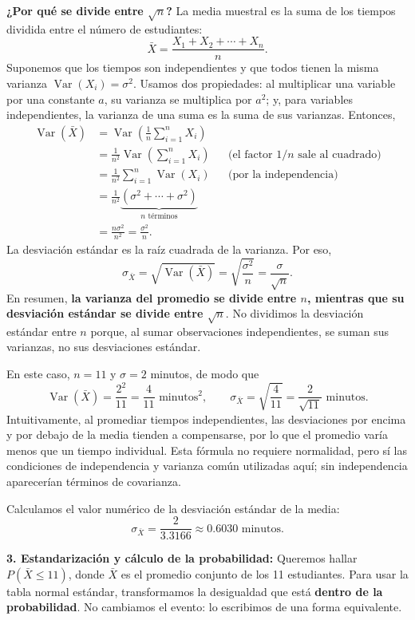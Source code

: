 \documentclass[a4paper]{article}
\begin{document}
\textbf{¿Por qué se divide entre $\sqrt{n}$?}
La media muestral es la suma de los tiempos dividida entre el número de estudiantes:
\[
\bar{X}=\frac{X_1+X_2+\cdots+X_n}{n}.
\]
Suponemos que los tiempos son independientes y que todos tienen la misma varianza $\operatorname{Var}(X_i)=\sigma^2$. Usamos dos propiedades: al multiplicar una variable por una constante $a$, su varianza se multiplica por $a^2$; y, para variables independientes, la varianza de una suma es la suma de sus varianzas. Entonces,
\begin{align*}
\operatorname{Var}(\bar{X})
&=\operatorname{Var}\left(\frac{1}{n}\sum_{i=1}^{n}X_i\right)\\
&=\frac{1}{n^2}\operatorname{Var}\left(\sum_{i=1}^{n}X_i\right)
&&\text{(el factor $1/n$ sale al cuadrado)}\\
&=\frac{1}{n^2}\sum_{i=1}^{n}\operatorname{Var}(X_i)
&&\text{(por la independencia)}\\
&=\frac{1}{n^2}\underbrace{(\sigma^2+\cdots+\sigma^2)}_{n\text{ términos}}\\
&=\frac{n\sigma^2}{n^2}=\frac{\sigma^2}{n}.
\end{align*}
La desviación estándar es la raíz cuadrada de la varianza. Por eso,
\[
\sigma_{\bar{X}}=\sqrt{\operatorname{Var}(\bar{X})}
=\sqrt{\frac{\sigma^2}{n}}
=\frac{\sigma}{\sqrt{n}}.
\]
En resumen, \textbf{la varianza del promedio se divide entre $n$, mientras que su desviación estándar se divide entre $\sqrt{n}$}. No dividimos la desviación estándar entre $n$ porque, al sumar observaciones independientes, se suman sus varianzas, no sus desviaciones estándar.

En este caso, $n=11$ y $\sigma=2$ minutos, de modo que
\[
\operatorname{Var}(\bar{X})=\frac{2^2}{11}=\frac{4}{11}\text{ minutos}^2,
\qquad
\sigma_{\bar{X}}=\sqrt{\frac{4}{11}}=\frac{2}{\sqrt{11}}\text{ minutos}.
\]
Intuitivamente, al promediar tiempos independientes, las desviaciones por encima y por debajo de la media tienden a compensarse, por lo que el promedio varía menos que un tiempo individual. Esta fórmula no requiere normalidad, pero sí las condiciones de independencia y varianza común utilizadas aquí; sin independencia aparecerían términos de covarianza.

Calculamos el valor numérico de la desviación estándar de la media:
$$\sigma_{\bar{X}} = \frac{2}{3.3166} \approx 0.6030 \text{ minutos.}$$

\textbf{3. Estandarización y cálculo de la probabilidad:}
Queremos hallar $P(\bar{X} \le 11)$, donde $\bar{X}$ es el promedio conjunto de los 11 estudiantes. Para usar la tabla normal estándar, transformamos la desigualdad que está \textbf{dentro de la probabilidad}. No cambiamos el evento: lo escribimos de una forma equivalente.
\end{document}
